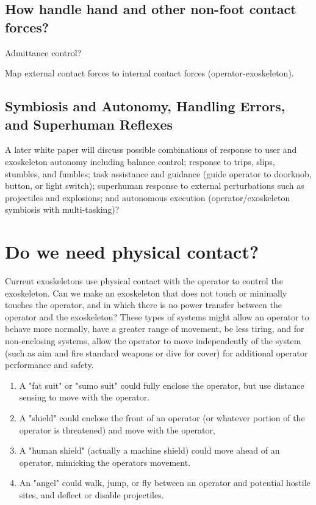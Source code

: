 \documentclass[letterpaper,12pt,fullpage]{article}
\begin{document}
\subsection{How handle hand and other non-foot contact forces?}

Admittance control?

Map external contact forces to internal contact forces (operator-exoskeleton).

\subsection{Symbiosis and Autonomy, Handling Errors, and Superhuman Reflexes}

A later white paper will discuss
possible combinations of response to user and exoskeleton
autonomy including balance control; response to trips, slips,
stumbles, and fumbles; task assistance and guidance (guide operator to
doorknob, button, or light switch); superhuman response to external
perturbations such as projectiles and explosions; and autonomous
execution (operator/exoskeleton symbiosis with multi-tasking)?

\section{Do we need physical contact?}

Current exoskeletons use physical contact with the operator to control
the exoskeleton. Can we make an exoskeleton that does not touch or
minimally touches the operator, and in which there is no power
transfer between the operator and the exoskeleton? These types of
systems might allow an operator to behave more normally, have a
greater range of movement, be less tiring, and for non-enclosing
systems, allow the operator to move independently of the system (such
as aim and fire standard weapons or dive for cover) for additional
operator performance and safety.
\begin{enumerate}
\item
A "fat suit" or "sumo suit" could fully enclose the operator, but
use distance sensing to move with the operator.
\item
A "shield" could enclose the front of an operator (or whatever
portion of the operator is threatened) and move with the operator,
\item
A "human shield" (actually a machine shield) could move ahead of
an operator, mimicking the operators movement.
\item
An "angel" could walk, jump, or fly between an operator and potential
hostile sites, and deflect or disable projectiles.
\end{enumerate}
\end{document}
